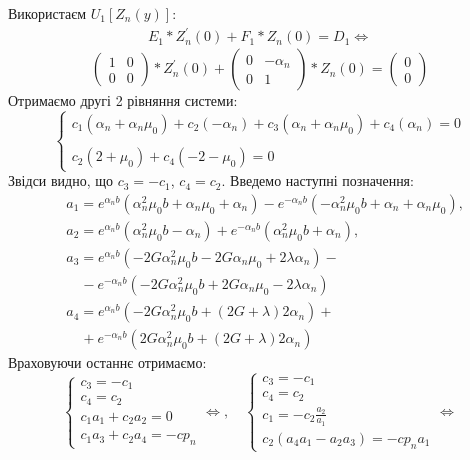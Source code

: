 Використаєм $U_1\left[ Z_n(y) \right]$:
\begin{eqnarray*}
    E_1 * Z_n^{'}(0) + F_1 * Z_n(0) = D_1 \Leftrightarrow
\end{eqnarray*}
\begin{equation*}
    \begin{pmatrix}
        1 & 0 \\
        0 & 0
    \end{pmatrix} * Z_n^{'}(0) + \begin{pmatrix}
        0 & -\alpha_n \\
        0 & 1
    \end{pmatrix} * Z_n(0) = \begin{pmatrix}
        0 \\
        0
    \end{pmatrix}
\end{equation*}
Отримаємо другі 2 рівняння системи:
\begin{equation*}
    \begin{cases}
        c_1 (\alpha_n + \alpha_n \mu_0) + c_2 (-\alpha_n) + c_3 (\alpha_n + \alpha_n \mu_0) + c_4 (\alpha_n) = 0 \\
        \\
        c_2 (2 + \mu_0) + c_4 (-2 - \mu_0) = 0
    \end{cases}
\end{equation*}
Звідси видно, що $c_3 = -c_1$, $c_4 = c_2$.
Введемо наступні позначення:
\begin{align*}
    &a_1 = e^{\alpha_n b} (\alpha_n^2 \mu_0 b + \alpha_n \mu_0 + \alpha_n) - e^{-\alpha_n b} (-\alpha_n^2 \mu_0 b + \alpha_n + \alpha_n \mu_0), \\
    &a_2 = e^{\alpha_n b} (\alpha_n^2 \mu_0 b - \alpha_n) + e^{-\alpha_n b} (\alpha_n^2 \mu_0 b + \alpha_n), \\
    &a_3 = e^{\alpha_n b} (-2 G \alpha_n^2 \mu_0 b - 2 G \alpha_n \mu_0 + 2 \lambda \alpha_n) - \\
    &\quad - e^{-\alpha_n b} (-2 G \alpha_n^2 \mu_0 b + 2G \alpha_n \mu_0 - 2\lambda \alpha_n) \\
    &a_4 = e^{\alpha_n b} (-2G \alpha_n^2 \mu_0 b + (2G + \lambda) 2 \alpha_n) + \\
    &\quad + e^{-\alpha_n b} (2G \alpha_n^2 \mu_0 b + (2G + \lambda) 2 \alpha_n)
\end{align*}
Враховуючи останнє отримаємо:
\begin{equation*}
    \begin{cases}
        c_3 = -c_1 \\
        c_4 = c_2 \\
        c_1 a_1 + c_2 a_2 = 0 \\
        c_1 a_3 + c_2 a_4 = -c p_n
    \end{cases} \Leftrightarrow, \quad 
    \begin{cases}
        c_3 = -c_1 \\
        c_4 = c_2 \\
        c_1 = - c_2 \frac{a_2}{a_1} \\
        c_2(a_4 a_1 - a_2 a_3) = -c p_n a_1
    \end{cases} \Leftrightarrow
\end{equation*}
